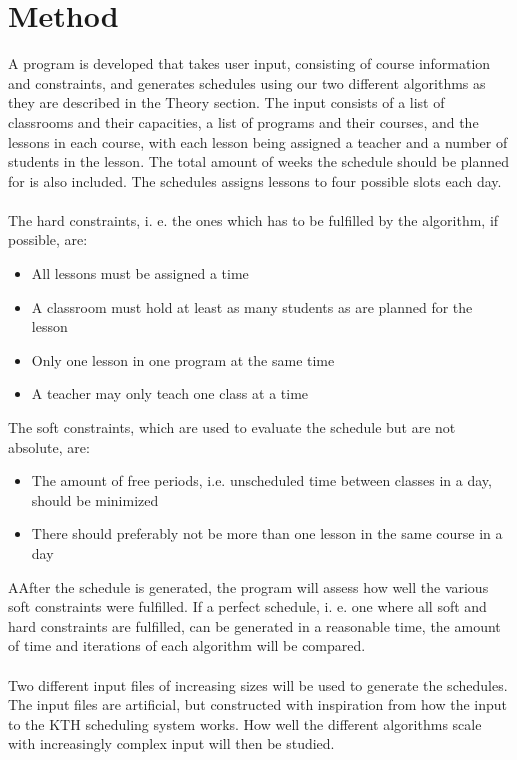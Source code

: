 \documentclass[titlepage,a4paper]{article}
\begin{document}
\section{Method}
A program is developed that takes user input, consisting of course information and constraints, and generates schedules using our two different algorithms as they are described in the Theory section. The input consists of a list of classrooms and their capacities, a list of programs and their courses, and the lessons in each course, with each lesson being assigned a teacher and a number of students in the lesson. The total amount of weeks the schedule should be planned for is also included.
The schedules assigns lessons to four possible slots each day. \\\\
The hard constraints, i. e. the ones which has to be fulfilled by the algorithm, if possible, are:
\begin{itemize}
  \item All lessons must be assigned a time
  \item A classroom must hold at least as many students as are planned for the lesson
  \item Only one lesson in one program at the same time
  \item A teacher may only teach one class at a time
\end{itemize} 
\medskip
The soft constraints, which are used to evaluate the schedule but are not absolute, are:
\begin{itemize}
  \item The amount of free periods, i.e. unscheduled time between classes in a day, should be minimized
  \item There should preferably not be more than one lesson in the same course in a day
\end{itemize}
\medskip
AAfter the schedule is generated, the program will assess how well the various soft constraints were fulfilled. If a perfect schedule, i. e. one where all soft and hard constraints are fulfilled, can be generated in a reasonable time, the amount of time and iterations of each algorithm will be compared. \\\\
Two different input files of increasing sizes will be used to generate the schedules. The input files are artificial, but constructed with inspiration from how the input to the KTH scheduling system works.
How well the different algorithms scale with increasingly complex input will then be studied.
\end{document}
